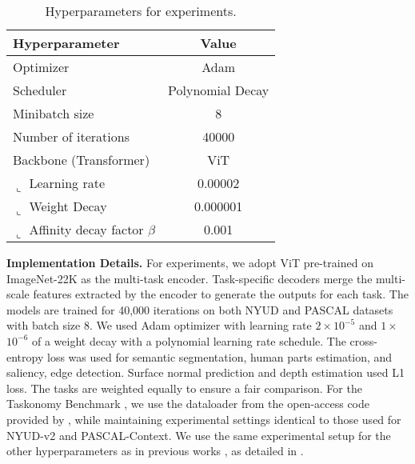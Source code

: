 \begin{table*}[h]
\caption{Hyperparameters for experiments.}
\centering
\renewcommand\arraystretch{1.20}
\begin{tabular}{lc}
\hline
Hyperparameter                  &  Value \\ \hline
Optimizer                       &  Adam \cite{kingma2014adam}\\
Scheduler                       &  Polynomial Decay\\
Minibatch size                  &  8\\
Number of iterations            &  40000\\
Backbone (Transformer)                        &  ViT \cite{vit} \\
\hspace{10pt}$\llcorner$ Learning rate                   &  0.00002\\
\hspace{10pt}$\llcorner$ Weight Decay                    &  0.000001\\
\hspace{10pt}$\llcorner$ Affinity decay factor $\beta$   &  0.001\\
\hline
\end{tabular}
\label{Implementation_details}
\end{table*}


\textbf{Implementation Details.} For experiments, we adopt ViT \cite{vit} pre-trained on ImageNet-22K \cite{deng2009imagenet} as the multi-task encoder.
Task-specific decoders merge the multi-scale features extracted by the encoder to generate the outputs for each task. The models are trained for 40,000 iterations on both NYUD \cite{RN15} and PASCAL \cite{RN12} datasets with batch size 8. We used Adam optimizer with learning rate $2\times$$10^{-5}$ and $1\times$$10^{-6}$ of a weight decay with a polynomial learning rate schedule. The cross-entropy loss was used for semantic segmentation, human parts estimation, and saliency, edge detection. Surface normal prediction and depth estimation used L1 loss. The tasks are weighted equally to ensure a fair comparison. For the Taskonomy Benchmark \cite{zamir2018taskonomy}, we use the dataloader from the open-access code provided by \cite{chen2023mod}, while maintaining experimental settings identical to those used for NYUD-v2 and PASCAL-Context. We use the same experimental setup for the other hyperparameters as in previous works \cite{invpt, ye2022taskprompter}, as detailed in .


